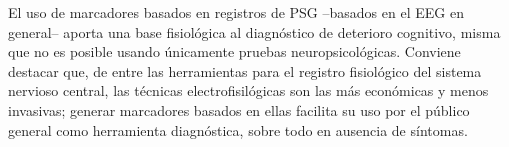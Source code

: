 El uso de marcadores basados en registros de PSG --basados en el EEG en general-- aporta una
base fisiológica al diagnóstico de deterioro cognitivo, misma que no es posible usando
únicamente pruebas neuropsicológicas.
%
Conviene destacar que, de entre las herramientas para el registro fisiológico del sistema nervioso
central, las técnicas electrofisilógicas son las más económicas y menos invasivas;
generar marcadores basados en ellas facilita su uso por el público general como herramienta 
diagnóstica, sobre todo en ausencia de síntomas.


